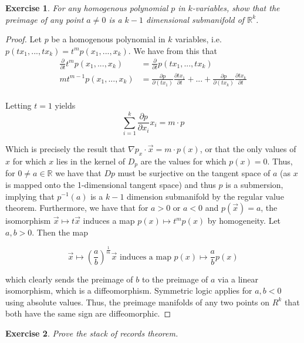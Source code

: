 \documentclass{article}
\newtheorem{exercise}{Exercise}
\begin{document}
  \begin{exercise}
    For any homogenous polynomial $p$ in $k$-variables, show that the preimage of any point $a \neq 0$ is a $k-1$ dimensional submanifold of $\mathbb{R}^{k}$.
  \end{exercise}
  \begin{proof}
    Let $p$ be a homogenous polynomial in $k$ variables, i.e. $p(tx_{1},...,tx_{k}) = t^{m}p(x_{1},...,x_{k})$. We have from this that
    \begin{align*}
      \frac{\partial}{\partial t} t^{m}p(x_{1},...,x_{k}) & = \frac{\partial}{\partial t} p(tx_{1},...,tx_{k}) \\
      mt^{m-1}p(x_{1},...,x_{k}) & = \frac{\partial p}{\partial (tx_{1})} \frac{\partial tx_{1}}{\partial t} + ... +  \frac{\partial p}{\partial (tx_{k})} \frac{\partial tx_{k}}{\partial t} \\
    \end{align*}

    Letting $t = 1$ yields
    \[
      \sum_{i=1}^{k} \frac{\partial p}{\partial x_{i}} x_{i} = m \cdot p
    \]

    Which is precisely the result that $\nabla p_{x} \cdot \vec{x} = m \cdot p(x)$, or that the only values of $x$ for which $x$ lies in the kernel of $D_{p}$ are the values for which $p(x) = 0$. Thus, for $0 \neq a \in \mathbb{R}$ we have that $Dp$ must be surjective on the tangent space of $a$ (as $x$ is mapped onto the 1-dimensional tangent space) and thus $p$ is a submersion, implying that $p^{-1}(a)$ is a $k-1$ dimension submanifold by the regular value theorem. Furthermore, we have that for $a > 0$ or $a < 0$ and $p(\vec{x}) = a$, the isomorphism $\vec{x} \mapsto t\vec{x}$ induces a map $p(x) \mapsto t^{m}p(x)$ by homogeneity. Let $a, b > 0$. Then the map

    \[
      \vec{x} \mapsto \left(\frac{a}{b}\right)^{\frac{1}{m}} \vec{x} \text{ induces a map } p(x) \mapsto \frac{a}{b} p(x)
    \]

    which clearly sends the preimage of $b$ to the preimage of $a$ via a linear isomorphism, which is a diffeomorphism. Symmetric logic applies for $a,b < 0$ using absolute values. Thus, the preimage manifolds of any two points on $R^{k}$ that both have the same sign are diffeomorphic.  
  \end{proof}

  \pagebreak

  \begin{exercise}
Prove the stack of records theorem.
    \end{exercise}
\end{document}
